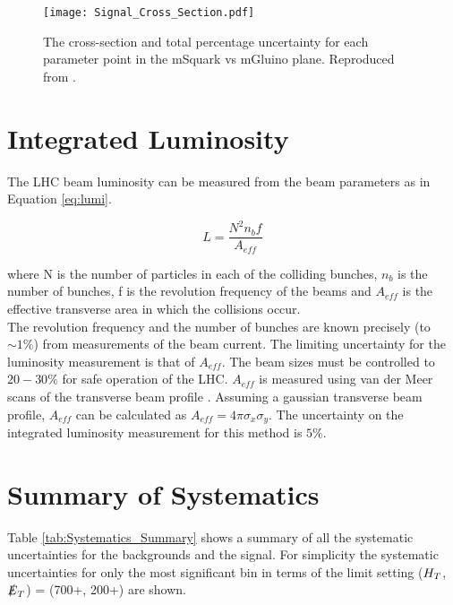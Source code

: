 \begin{figure}
\begin{center}
\texttt{[image: Signal\_Cross\_Section.pdf]}
\end{center}
\caption{The cross-section and total percentage uncertainty for each parameter 
point in the mSquark vs mGluino plane. Reproduced from \cite{ra3}.}
\label{fig:xsec_unc}
\end{figure}

\section{Integrated Luminosity}

The LHC beam luminosity can be measured from the beam parameters as in Equation
\ref{eq:lumi}.

\begin{equation}
L = \frac{N^{2}n_{b}f}{A_{eff}}
\label{eq:lumi}
\end{equation}

where N is the number of particles in each of the colliding bunches, $n_{b}$ is
the number of bunches, f is the revolution frequency of the beams and $A_{eff}$
is the effective transverse area in which the collisions occur. \\

The revolution frequency and the number of bunches are known precisely (to $\sim
1\unit{\%}$) from measurements of the beam current. The limiting uncertainty for 
the luminosity measurement is that of $A_{eff}$. The beam sizes must be 
controlled to $20-30\unit{\%}$ for safe operation of the LHC. $A_{eff}$ is 
measured using van der Meer scans of the transverse beam profile 
\cite{vdm_scans}. Assuming a gaussian transverse beam profile, $A_{eff}$ can be 
calculated as $A_{eff} = 4\pi\sigma_{x}\sigma_{y}$. The uncertainty on the 
integrated luminosity measurement for this method is $5\unit{\%}$. \\

\section{Summary of Systematics}

Table \ref{tab:Systematics_Summary} shows a summary of all the systematic
uncertainties for the backgrounds and the signal. For simplicity the systematic
uncertainties for only the most significant bin in terms of the limit setting 
($H_{T}$, $\slashed{E}_{T}$) = (700+, 200+) are shown.

